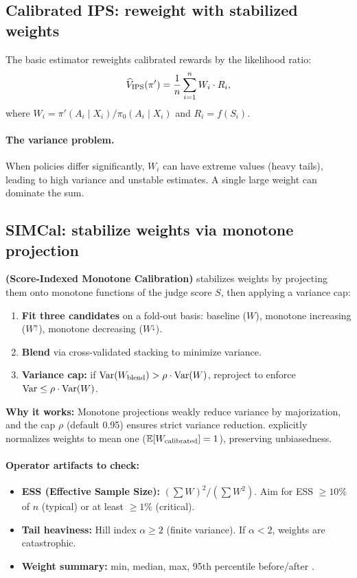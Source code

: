 \subsection{Calibrated IPS: reweight with stabilized weights}

The basic \ips{} estimator reweights calibrated rewards by the likelihood ratio:
\begin{equation}
\widehat{V}_{\text{IPS}}(\pi') = \frac{1}{n} \sum_{i=1}^n W_i \cdot R_i,
\end{equation}
where $W_i = \pi'(A_i \mid X_i) / \pi_0(A_i \mid X_i)$ and $R_i = f(S_i)$.

\paragraph{The variance problem.} When policies differ significantly, $W_i$ can have extreme values (heavy tails), leading to high variance and unstable estimates. A single large weight can dominate the sum.

\subsection{SIMCal: stabilize weights via monotone projection}

\textbf{\simcal{} (Score-Indexed Monotone Calibration)} stabilizes weights by projecting them onto monotone functions of the judge score $S$, then applying a variance cap:

\begin{enumerate}
\item \textbf{Fit three candidates} on a fold-out basis: baseline ($W$), monotone increasing ($W^\uparrow$), monotone decreasing ($W^\downarrow$).
\item \textbf{Blend} via cross-validated stacking to minimize variance.
\item \textbf{Variance cap:} if $\operatorname{Var}(W_{\text{blend}}) > \rho \cdot \operatorname{Var}(W)$, reproject to enforce $\operatorname{Var} \le \rho \cdot \operatorname{Var}(W)$.
\end{enumerate}

\textbf{Why it works:} Monotone projections weakly reduce variance by majorization, and the cap $\rho$ (default 0.95) ensures strict variance reduction. \simcal{} explicitly normalizes weights to mean one ($\operatorname{\mathbb{E}}[W_{\text{calibrated}}] = 1$), preserving unbiasedness.

\paragraph{Operator artifacts to check:}
\begin{itemize}
\item \textbf{ESS (Effective Sample Size):} $({\textstyle\sum} W)^2 / ({\textstyle\sum} W^2)$. Aim for ESS $\ge 10\%$ of $n$ (typical) or at least $\ge 1\%$ (critical).
\item \textbf{Tail heaviness:} Hill index $\alpha \ge 2$ (finite variance). If $\alpha < 2$, weights are catastrophic.
\item \textbf{Weight summary:} min, median, max, 95th percentile before/after \simcal.
\end{itemize}

